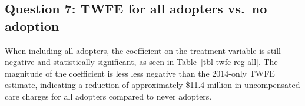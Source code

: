 \documentclass[
  letterpaper,
  DIV=11,
  numbers=noendperiod]{scrartcl}
\begin{document}
\begin{table}[H]

\caption{\label{tbl-twfe-reg-2014}Two-Way Fixed Effects Regression
Results for 2014 Adopters}


\end{table}%

\subsection{Question 7: TWFE for all adopters vs.~no
adoption}\label{question-7-twfe-for-all-adopters-vs.-no-adoption}

When including all adopters, the coefficient on the treatment variable
is still negative and statistically significant, as seen in
Table~\ref{tbl-twfe-reg-all}. The magnitude of the coefficient is less
less negative than the 2014-only TWFE estimate, indicating a reduction
of approximately \$11.4 million in uncompensated care charges for all
adopters compared to never adopters.
\end{document}
